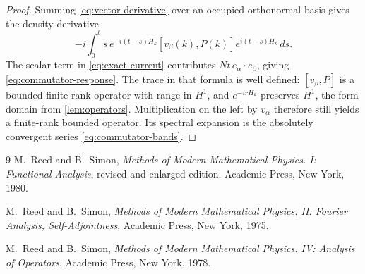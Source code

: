 \documentclass[11pt,a4paper]{article}
\numberwithin{equation}{section}
\begin{document}
\begin{proof}
Summing \eqref{eq:vector-derivative} over an occupied orthonormal basis
gives the density derivative
\[
 -i\int_0^t s\,e^{-i(t-s)H_k}
 [v_\beta(k),P(k)]e^{i(t-s)H_k}\,ds.
\]
The scalar term in \eqref{eq:exact-current} contributes
$Nt\,e_\alpha\cdot e_\beta$, giving
\eqref{eq:commutator-response}. The trace in that formula is well
defined: $[v_\beta,P]$ is a bounded finite-rank operator with range in
$H^1$, and $e^{-irH_k}$ preserves $H^1$, the form domain from
\cref{lem:operators}. Multiplication on the left by $v_\alpha$ therefore
still yields a finite-rank bounded operator. Its spectral expansion is
the absolutely convergent series \eqref{eq:commutator-bands}.
\end{proof}

\begin{thebibliography}{9}
M.~Reed and B.~Simon,
\emph{Methods of Modern Mathematical Physics. I: Functional Analysis},
revised and enlarged edition, Academic Press, New York, 1980.

M.~Reed and B.~Simon,
\emph{Methods of Modern Mathematical Physics. II: Fourier Analysis,
Self-Adjointness}, Academic Press, New York, 1975.

M.~Reed and B.~Simon,
\emph{Methods of Modern Mathematical Physics. IV: Analysis of Operators},
Academic Press, New York, 1978.
\end{thebibliography}
\end{document}
